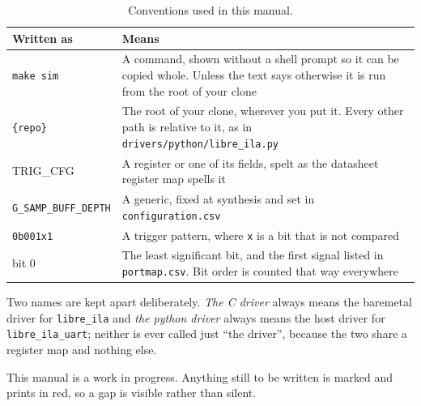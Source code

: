 \documentclass[../manual.tex]{subfiles}
\begin{document}
\begin{table}[H]
    \centering
    \begin{tabularx}{\textwidth}{|l|X|}
        \hline
        \rowcolor{gray!40} \textbf{Written as} & \textbf{Means} \\
        \hline
        \texttt{make sim} & A command, shown without a shell prompt so it can be copied whole. Unless the text says otherwise it is run from the root of your clone \\
        \hline
        \texttt{\{repo\}} & The root of your clone, wherever you put it. Every other path is relative to it, as in \texttt{drivers/python/libre\_ila.py} \\
        \hline
        TRIG\_CFG & A register or one of its fields, spelt as the datasheet register map spells it \\
        \hline
        \texttt{G\_SAMP\_BUFF\_DEPTH} & A generic, fixed at synthesis and set in \texttt{configuration.csv} \\
        \hline
        \hline
        \texttt{0b001x1} & A trigger pattern, where \texttt{x} is a bit that is not compared \\
        \hline
        bit 0 & The least significant bit, and the first signal listed in \texttt{portmap.csv}. Bit order is counted that way everywhere \\
        \hline
    \end{tabularx}
    \caption{Conventions used in this manual.}
    \label{tab:intro_conventions}
\end{table}

Two names are kept apart deliberately. \emph{The C driver} always means the baremetal driver for \texttt{libre\_ila} and \emph{the python driver} always means the host driver for \texttt{libre\_ila\_uart}; neither is ever called just ``the driver'', because the two share a register map and nothing else.

This manual is a work in progress. Anything still to be written is marked  and prints in red, so a gap is visible rather than silent.
\end{document}
